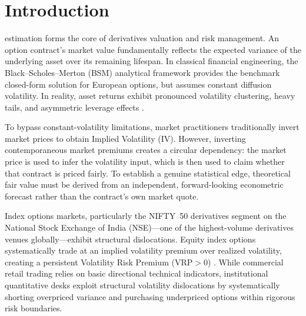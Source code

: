\documentclass[journal]{IEEEtran}
\begin{document}
\IEEEpeerreviewmaketitle

\section{Introduction}

 estimation forms the core of derivatives valuation and risk management. An option contract's market value fundamentally reflects the expected variance of the underlying asset over its remaining lifespan. In classical financial engineering, the Black--Scholes--Merton (BSM) analytical framework \cite{black1973,merton1973} provides the benchmark closed-form solution for European options, but assumes constant diffusion volatility. In reality, asset returns exhibit pronounced volatility clustering, heavy tails, and asymmetric leverage effects \cite{engle1982,bollerslev1986,nelson1991}.

To bypass constant-volatility limitations, market practitioners traditionally invert market prices to obtain Implied Volatility (IV). However, inverting contemporaneous market premiums creates a circular dependency: the market price is used to infer the volatility input, which is then used to claim whether that contract is priced fairly. To establish a genuine statistical edge, theoretical fair value must be derived from an independent, forward-looking econometric forecast rather than the contract's own market quote.

Index options markets, particularly the NIFTY~50 derivatives segment on the National Stock Exchange of India (NSE)---one of the highest-volume derivatives venues globally---exhibit structural dislocations. Equity index options systematically trade at an implied volatility premium over realized volatility, creating a persistent Volatility Risk Premium ($\mathrm{VRP} > 0$) \cite{carr_wu_2009}. While commercial retail trading relies on basic directional technical indicators, institutional quantitative desks exploit structural volatility dislocations by systematically shorting overpriced variance and purchasing underpriced options within rigorous risk boundaries.
\end{document}
